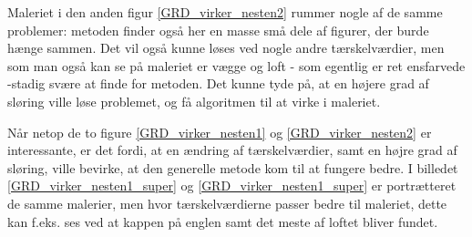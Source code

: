 Maleriet i den anden figur \ref{GRD_virker_nesten2} rummer nogle af de
samme problemer: metoden finder også her en masse små dele af figurer,
der burde hænge sammen. Det vil også kunne løses ved nogle andre
tærskelværdier, men som man også kan se på maleriet er vægge og loft -
som egentlig er ret ensfarvede -stadig svære at finde for metoden. Det
kunne tyde på, at en højere grad af sløring ville løse problemet, og få
algoritmen til at virke i maleriet.

Når netop de to figure \ref{GRD_virker_nesten1} og
\ref{GRD_virker_nesten2} er interessante, er det fordi, at en ændring af
tærskelværdier, samt en højre grad af sløring, ville bevirke, at den
generelle metode kom til at fungere bedre. I billedet
\ref{GRD_virker_nesten1_super} og \ref{GRD_virker_nesten1_super} er
portrætteret de samme malerier, men hvor tærskelværdierne passer bedre til
maleriet, dette kan f.eks. ses ved at kappen på englen samt det meste af
loftet bliver fundet.

\clearpage

